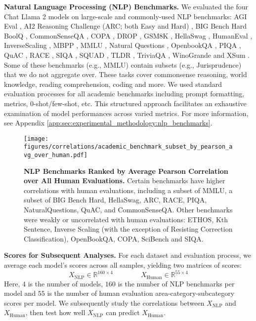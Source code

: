 \textbf{Natural Language Processing (NLP) Benchmarks.} We evaluated the four Chat Llama 2 models on large-scale and commonly-used NLP benchmarks: AGI Eval \citep{zhong2023agieval}, AI2 Reasoning Challenge (ARC; both Easy and Hard) \citep{clark2018arc}, BIG Bench Hard \citep{srivastava2022beyond,suzgun2022challenging} BoolQ \citep{clark2019boolq}, CommonSenseQA \citep{talmor2019commonsenseqa}, COPA \citep{roemmele2011choice}, DROP \citep{dua2019drop}, GSM8K \citep{cobbe2021training}, HellaSwag \citep{zellers2019hellaswag}, HumanEval \citep{chen2021evaluatinglargelanguagemodels}, InverseScaling \citep{mckenzie2022inverse,mckenzie2022round1,mckenzie2022round2}, MBPP \citep{austin2021program}, MMLU \citep{hendrycks2020measuring}, Natural Questions \citep{kwiatkowski2019naturalquestions}, OpenbookQA \citep{mihaylov2018openbookqa}, PIQA \citep{bisk2020piqa}, QuAC \citep{choi2018quac}, RACE \citep{lai2017race}, SIQA \citep{sap2019social}, SQUAD \citep{rajpurkar2016squad}, TLDR \citep{volske2017tl}, TriviaQA \citep{joshi2017triviaqa}, WinoGrande \citep{sakaguchi2021winogrande} and XSum \citep{narayan2018xsum}. Some of these benchmarks (e.g., MMLU) contain subsets (e.g., Jurisprudence) that we do not aggregate over.
These tasks cover commonsense reasoning, world knowledge, reading comprehension, coding and more. We used standard evaluation processes for all academic benchmarks including prompt formatting, metrics, 0-shot/few-shot, etc.
This structured approach facilitates an exhaustive examination of model performances across varied metrics.
For more information, see Appendix \ref{app:sec:experimental_methodology:nlp_benchmarks}.

\begin{figure*}[t!]
    \centering
    \texttt{[image: figures/correlations/academic\_benchmark\_subset\_by\_pearson\_avg\_over\_human.pdf]}
    \caption{\textbf{NLP Benchmarks Ranked by Average Pearson Correlation over All Human Evaluations.} Certain benchmarks have higher correlations with human evaluations, including a subset of MMLU, a subset of BIG Bench Hard, HellaSwag, ARC, RACE, PIQA, NaturalQuestions, QuAC, and CommonSenseQA. Other benchmarks were weakly or uncorrelated with human evaluations: ETHOS, Kth Sentence, Inverse Scaling (with the exception of Resisting Correction Classification), OpenBookQA, COPA, SciBench and SIQA.}\label{fig:corr:academic_vs_correlation_split_corrmethod}
\end{figure*}

\textbf{Scores for Subsequent Analyses.} For each dataset and evaluation process, we average each model's scores across all samples, yielding two matrices of scores:
%
$$X_{\text{NLP}} \in \mathbb{R}^{160 \times 4} \quad \quad \quad \quad X_{\text{Human}} \in \mathbb{R}^{55 \times 4}$$
%
Here, $4$ is the number of models, $160$ is the number of NLP benchmarks per model and $55$ is the number of human evaluation area-category-subcategory scores per model. We subsequently study the correlations between $X_{\text{NLP}}$ and $X_{\text{Human}}$, then test how well $X_{\text{NLP}}$ can predict $X_{\text{Human}}$.

